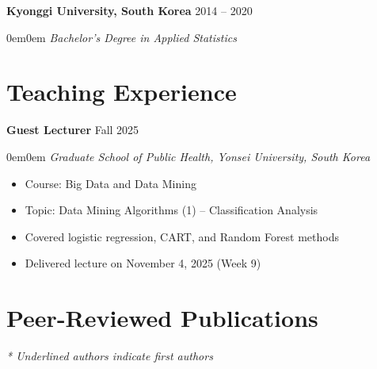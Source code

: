 \documentclass[10pt,a4paper]{article}
\newcommand{\CVItem}[2]{
    \noindent\textbf{#1} \hfill #2\\
}
\newcommand{\CVSubItem}[1]{
    \vspace{-0.8em}
    \begin{adjustwidth}{0em}{0em}
    \textit{#1}
    \end{adjustwidth}
    \vspace{0.3em}
}
\begin{document}
\CVItem{Kyonggi University, South Korea}{2014 -- 2020}
\CVSubItem{Bachelor's Degree in Applied Statistics}

\section*{Teaching Experience}

\CVItem{Guest Lecturer}{Fall 2025}
\CVSubItem{Graduate School of Public Health, Yonsei University, South Korea}
\vspace{-0.5em}
\begin{itemize}
    \item Course: Big Data and Data Mining
    \item Topic: Data Mining Algorithms (1) -- Classification Analysis
    \item Covered logistic regression, CART, and Random Forest methods
    \item Delivered lecture on November 4, 2025 (Week 9)
\end{itemize}

\section*{Peer-Reviewed Publications}
{\small \textit{* Underlined authors indicate first authors}}\\[0.3em]
\end{document}
